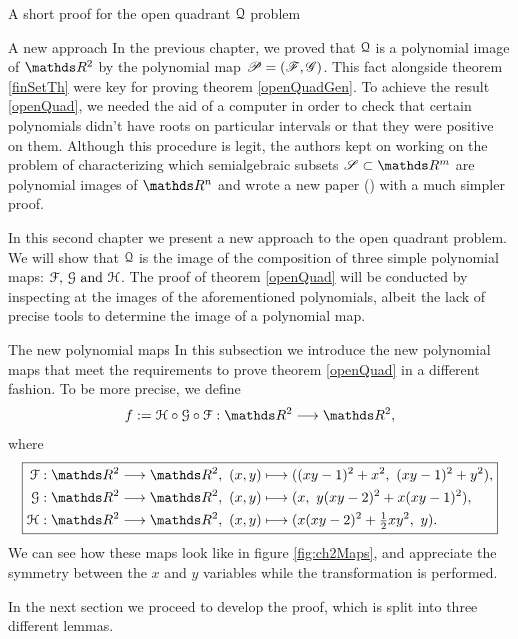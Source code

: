 \documentclass[11pt, a4paper, english, twoside, notitlepage, openright]{report}
\begin{document}
\begin{chapter}{A short proof for the open quadrant $\mathcal{Q}$ problem}
\begin{section}{A new approach}
In the previous chapter, we proved that $\mathcal{Q}$ is a polynomial image of $\R^2$ by the polynomial map $\mathscr{P} = (\mathscr{F}, \mathscr{G})$. This fact alongside theorem \ref{finSetTh} were key for proving theorem \ref{openQuadGen}. To achieve the result \ref{openQuad}, we needed the aid of a computer in order to check that certain polynomials didn't have roots on particular intervals or that they were positive on them. Although this procedure is legit, the authors kept on working on the problem of characterizing which semialgebraic subsets $\mathscr{S} \subset \R^m$ are polynomial images of $\R^n$ and wrote a new paper (\cite{fu}) with a much simpler proof.

In this second chapter we present a new approach to the open quadrant problem. We will show that $\mathcal{Q}$ is the image of the composition of three simple polynomial maps: $\mathcal{F},\, \mathcal{G} \text{ and } \mathcal{H}$. The proof of theorem \ref{openQuad} will be conducted by inspecting at the images of the aforementioned polynomials, albeit the lack of precise tools to determine the image of a polynomial map.

\begin{subsection}{The new polynomial maps}
In this subsection we introduce the new polynomial maps that meet the requirements to prove theorem \ref{openQuad} in a different fashion. To be more precise, we define 
$$
f:= \HH \circ \GG \circ \FF: \R^2\longrightarrow \R^2,
$$
where
\begin{equation*}
\boxed{
\begin{aligned}
\FF: \R^2\longrightarrow \R^2,\ (x,y)& \longmapsto ((xy - 1)^2 + x^2,\ (xy - 1)^2 + y^2), \\
\GG: \R^2\longrightarrow \R^2,\ (x,y)& \longmapsto (x,\ y(xy - 2)^2 + x (xy - 1)^2), \\
\HH: \R^2\longrightarrow \R^2,\ (x, y)& \longmapsto (x(xy - 2)^2 + \tfrac{1}{2} xy^2,\ y). \\
\end{aligned}
}
\end{equation*}
We can see how these maps look like in figure \ref{fig:ch2Maps}, and appreciate the symmetry between the $x$ and $y$ variables while the transformation is performed.

In the next section we proceed to develop the proof, which is split into three different lemmas.


\end{subsection}
\end{section}
\end{chapter}
\end{document}
